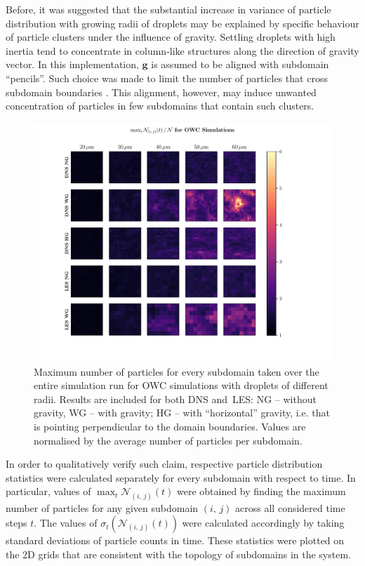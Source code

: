 \documentclass{pracamgren}
\begin{document}
Before, it was suggested that the substantial increase in variance of particle distribution with growing radii of droplets may be explained by specific behaviour of particle clusters under the influence of gravity.
Settling droplets with high inertia tend to concentrate in column-like structures along the direction of gravity vector.
In this implementation, $\mathbf{g}$ is assumed to be aligned with subdomain ``pencils''.
Such choice was made to limit the number of particles that cross subdomain boundaries \parencite{Ayala2014}.
This alignment, however, may induce unwanted concentration of particles in few subdomains that contain such clusters.

\begin{figure}[!htbp]
\centering
\includegraphics[width=17cm]{img/plots/3-4f-pfpgridowcmax.pdf}
\caption{
Maximum number of particles for every subdomain taken over the entire simulation run for OWC simulations with droplets of different radii.
Results are included for both DNS and~LES: NG -- without gravity, WG -- with gravity; HG -- with ``horizontal'' gravity, i.e. that is pointing perpendicular to the domain boundaries.
Values are normalised by the average number of particles per subdomain.
}
\label{fig:pfpgridowcmax}
\end{figure}

In order to qualitatively verify such claim, respective particle distribution statistics were calculated separately for every subdomain with respect to time.
In particular, values of $\max_{t} \mathcal{N}_{(i,\,j)}(t)$ were obtained by finding the maximum number of particles for any given subdomain $(i,\,j)$ across all considered time steps $t$.
The values of $\sigma_{t} (\mathcal{N}_{(i,\,j)}(t))$ were calculated accordingly by taking standard deviations of particle counts in time.
These statistics were plotted on the 2D grids that are consistent with the topology of subdomains in the system.
\end{document}

